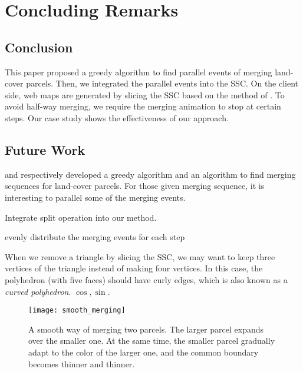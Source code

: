 \documentclass[ijgi,article,submit,moreauthors,pdftex]{Definitions/mdpi}
\begin{document}
\section{Concluding Remarks}
\label{sec:concluding_remarks}

\subsection{Conclusion}
This paper proposed a greedy algorithm to find parallel events of 
merging land-cover parcels.
Then, we integrated the parallel events into the SSC. 
On the client side, web maps are generated by slicing the SSC
based on the method of \citet{Meijers2020Web}.
To avoid half-way merging, we require the merging animation 
to stop at certain steps.
Our case study shows the effectiveness of our approach.


\subsection{Future Work}

\citet{vanOosterom2005} and \citet[]{Peng2019Thesis}
respectively developed a greedy algorithm and an \Astar algorithm to find
merging sequences for land-cover parcels.
For those given merging sequence,
it is interesting to parallel some of the merging events.

Integrate split operation into our method.

evenly distribute the merging events for each step

When we remove a triangle by slicing the SSC, 
we may want to keep three vertices of the triangle 
instead of making four vertices.
In this case, the polyhedron (with five faces) should have curly edges,
which is also known as a \emph{curved polyhedron}.
$\cos, \sin$.



\begin{figure}[tb]
\centering
\texttt{[image: smooth\_merging]}
\caption{A smooth way of merging two parcels.
    The larger parcel expands over the smaller one.
    At the same time, 
    the smaller parcel gradually adapt to the color of the larger one,
    and the common boundary becomes thinner and thinner.}
\label{fig:smooth_merging_future}
\end{figure}




\end{document}
